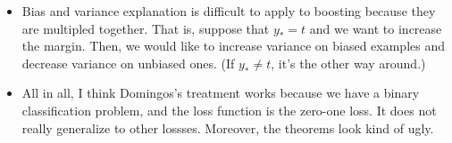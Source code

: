 \documentclass[10pt]{article}
\begin{document}
\begin{itemize}
    \item Bias and variance explanation is difficult to apply to boosting because they are multipled together. That is, suppose that $y_* = t$ and we want to increase the margin. Then, we would like to increase variance on biased examples and decrease variance on unbiased ones. (If $y_* \neq t$, it's the other way around.)

    \item All in all, I think Domingos's treatment works because we have a binary classification problem, and the loss function is the zero-one loss. It does not really generalize to other lossses. Moreover, the theorems look kind of ugly.
  \end{itemize}

  
    
\end{document}
